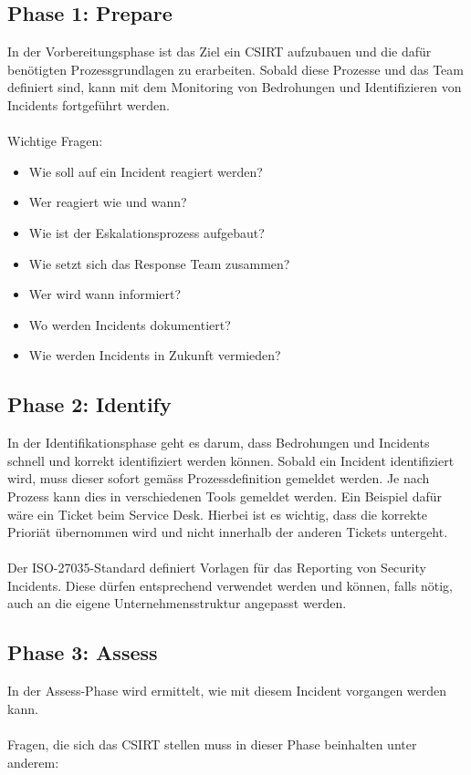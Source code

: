 \subsection{Phase 1: Prepare}
In der Vorbereitungsphase ist das Ziel ein CSIRT aufzubauen und die dafür benötigten Prozessgrundlagen zu erarbeiten. Sobald diese Prozesse und das Team definiert sind, kann mit dem Monitoring von Bedrohungen und Identifizieren von Incidents fortgeführt werden. \\
\\
Wichtige Fragen:
\begin{itemize}
\item Wie soll auf ein Incident reagiert werden?
\item Wer reagiert wie und wann?
\item Wie ist der Eskalationsprozess aufgebaut?
\item Wie setzt sich das Response Team zusammen?
\item Wer wird wann informiert?
\item Wo werden Incidents dokumentiert?
\item Wie werden Incidents in Zukunft vermieden?
\end{itemize}

\subsection{Phase 2: Identify}
In der Identifikationsphase geht es darum, dass Bedrohungen und Incidents schnell und korrekt identifiziert werden können. Sobald ein Incident identifiziert wird, muss dieser sofort gemäss Prozessdefinition gemeldet werden. Je nach Prozess kann dies in verschiedenen Tools gemeldet werden. Ein Beispiel dafür wäre ein Ticket beim Service Desk. Hierbei ist es wichtig, dass die korrekte Prioriät übernommen wird und nicht innerhalb der anderen Tickets untergeht.\\
\\
Der ISO-27035-Standard definiert Vorlagen für das Reporting von Security Incidents. Diese dürfen entsprechend verwendet werden und können, falls nötig, auch an die eigene Unternehmensstruktur angepasst werden.

\subsection{Phase 3: Assess}
In der Assess-Phase wird ermittelt, wie mit diesem Incident vorgangen werden kann.\\
\\
Fragen, die sich das CSIRT stellen muss in dieser Phase beinhalten unter anderem:

